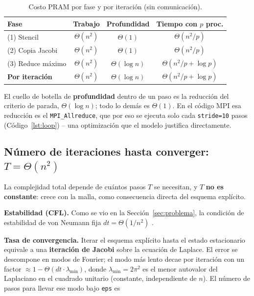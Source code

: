 \documentclass[11pt,a4paper]{article}
\begin{document}
	\enlargethispage{3 \baselineskip}
	\begin{table}[H]
	\centering
	\begin{tabular}{lccc}
		\toprule
		\textbf{Fase} & \textbf{Trabajo} & \textbf{Profundidad} & \textbf{Tiempo con $p$ proc.} \\
		\midrule
		(1) Stencil & $\Theta(n^2)$ & $\Theta(1)$ & $\Theta(n^2/p)$ \\
		(2) Copia Jacobi & $\Theta(n^2)$ & $\Theta(1)$ & $\Theta(n^2/p)$ \\
		(3) Reduce máximo & $\Theta(n^2)$ & $\Theta(\log n)$ & $\Theta(n^2/p+\log p)$ \\
		\midrule
		\textbf{Por iteración} & $\Theta(n^2)$ & $\Theta(\log n)$ & $\Theta(n^2/p+\log p)$ \\
		\bottomrule
	\end{tabular}
	\caption{Costo PRAM por fase y por iteración (sin comunicación).}
	\label{tab:dag-costos}
	\end{table}

	El cuello de botella de \textbf{profundidad} dentro de un paso es la reducción del
	criterio de parada, $\Theta(\log n)$; todo lo demás es $\Theta(1)$. En el código
	MPI esa reducción es el \texttt{MPI\_Allreduce}, que por eso se ejecuta solo cada
	\texttt{stride=10} pasos (Código~\ref{lst:loop}) -- una optimización que el
	modelo justifica directamente.

	\subsection{Número de iteraciones hasta converger: \texorpdfstring{$T=\Theta(n^2)$}{T=Theta(n2)}}
	\label{sec:Tn2}

	La complejidad total depende de cuántos pasos $T$ se necesitan, y $T$
	\textbf{no es constante}: crece con la malla, como consecuencia directa del
	esquema explícito.

	\textbf{Estabilidad (CFL).} Como se vio en la Sección~\ref{sec:problema}, la
	condición de estabilidad de von Neumann fija $dt = \Theta(1/n^2)$
	\cite{mit18300, vnsa-wiki}.

	\textbf{Tasa de convergencia.} Iterar el esquema explícito hasta el estado
	estacionario equivale a una \textbf{iteración de Jacobi} sobre la ecuación de
	Laplace. El error se descompone en modos de Fourier; el modo más lento decae por
	iteración con un factor $\approx 1-\Theta(dt\cdot\lambda_{\min})$, donde
	$\lambda_{\min}=2\pi^2$ es el menor autovalor del Laplaciano en el cuadrado
	unitario (constante, independiente de $n$). El número de pasos para llevar ese
	modo bajo \texttt{eps} es
\end{document}
